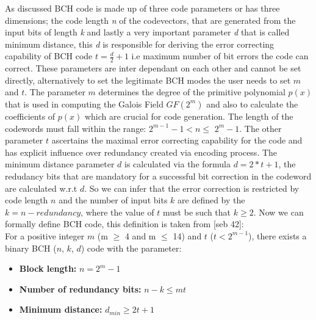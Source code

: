 As discussed BCH code is made up of three code parameters or has three dimensions; the code length \emph{n} of the codevectors, that are generated from the input bits of length \emph{k} and lastly a very important parameter \emph{d} that is called minimum distance, this \emph{d} is responsible for deriving the error correcting capability of BCH code $t = \frac{d}{2} + 1$ i.e maximum number of bit errors the code can correct. These parameters are inter dependant on each other
and cannot be set directly, alternatively to set the legitimate BCH modes the user needs to set $m$ and $t$. The parameter $m$ determines the degree of the primitive polynomial $p(x)$ that is used in computing the Galois Field $GF(2^m)$ and also to calculate the coefficients of $p(x)$ which are crucial for code generation. The length of the codewords must fall within the range: $2^{m-1} - 1 < n \leq$ $2^m - 1$. The other parameter $t$ ascertains the maximal error correcting capability
for the code and has explicit influence over redundancy created via encoding process. The minimum distance parameter $d$ is calculated via the formula $d = 2 * t + 1$, the redudancy bits that are mandatory for a successful bit correction in the codeword are calculated w.r.t $d$. So we can infer that the error correction is restricted by code length $n$ and the number of input bits $k$ are defined by the $k = n - redundancy$, where the value of $t$ must be such that $k \geq 2$. Now we can
formally define BCH code, this definition is taken from [seb 42]:\\

For a positive integer $m$ (m $\geq$ 4 and m $\leq$ 14) and $t$ ($t < 2^{m-1}$), there exists a binary BCH ($n$, $k$, $d$) code with the parameter:
\begin{itemize}
\item \textbf{Block length:} $n = 2^m - 1$
\item \textbf{Number of redundancy bits:} $n - k \leq mt$
\item \textbf{Minimum distance:} $d_{min} \geq 2t + 1$
\end{itemize}

